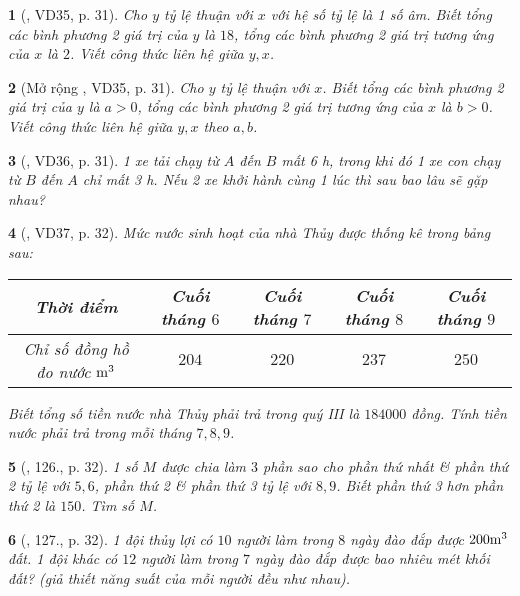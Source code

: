 \documentclass{article}
\newtheorem{baitoan}{}
\begin{document}
\begin{baitoan}[\cite{Tuyen_Toan_7}, VD35, p. 31]
	Cho $y$ tỷ lệ thuận với $x$ với hệ số tỷ lệ là 1 số âm. Biết tổng các bình phương 2 giá trị của $y$ là $18$, tổng các bình phương 2 giá trị tương ứng của $x$ là $2$. Viết công thức liên hệ giữa $y,x$.
\end{baitoan}

\begin{baitoan}[Mở rộng \cite{Tuyen_Toan_7}, VD35, p. 31]
	Cho $y$ tỷ lệ thuận với $x$. Biết tổng các bình phương 2 giá trị của $y$ là $a > 0$, tổng các bình phương 2 giá trị tương ứng của $x$ là $b > 0$. Viết công thức liên hệ giữa $y,x$ theo $a,b$.
\end{baitoan}

\begin{baitoan}[\cite{Tuyen_Toan_7}, VD36, p. 31]
	1 xe tải chạy từ $A$ đến $B$ mất {\rm6 h}, trong khi đó 1 xe con chạy từ $B$ đến $A$ chỉ mất {\rm3 h}. Nếu 2 xe khởi hành cùng 1 lúc thì sau bao lâu sẽ gặp nhau?
\end{baitoan}

\begin{baitoan}[\cite{Tuyen_Toan_7}, VD37, p. 32]
	Mức nước sinh hoạt của nhà Thủy được thống kê trong bảng sau:	
	\begin{table}[H]
		\centering
		\begin{tabular}{|c|c|c|c|c|}
			\hline
			Thời điểm & Cuối tháng $6$ & Cuối tháng $7$ & Cuối tháng $8$ & Cuối tháng $9$ \\
			\hline
			Chỉ số đồng hồ đo nước $\rm m^3$ & $204$ & $220$ & $237$ & $250$ \\
			\hline
		\end{tabular}
	\end{table}
	\noindent Biết tổng số tiền nước nhà Thủy phải trả trong quý III là $184000$ đồng. Tính tiền nước phải trả trong mỗi tháng $7,8,9$.
\end{baitoan}

\begin{baitoan}[\cite{Tuyen_Toan_7}, 126., p. 32]
	1 số $M$ được chia làm $3$ phần sao cho phần thứ nhất \& phần thứ 2 tỷ lệ với $5,6$, phần thứ 2 \& phần thứ 3 tỷ lệ với $8,9$. Biết phần thứ 3 hơn phần thứ 2 là $150$. Tìm số $M$.
\end{baitoan}

\begin{baitoan}[\cite{Tuyen_Toan_7}, 127., p. 32]
	1 đội thủy lợi có $10$ người làm trong $8$ ngày đào đắp được $\rm200m^3$ đất. 1 đội khác có $12$ người làm trong $7$ ngày đào đắp được bao nhiêu mét khối đất? (giả thiết năng suất của mỗi người đều như nhau).
\end{baitoan}
\end{document}
